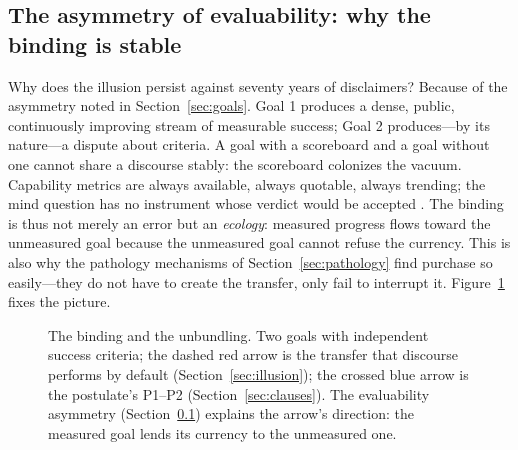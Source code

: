 \documentclass[10pt]{article}
\begin{document}
\subsection{The asymmetry of evaluability: why the binding is stable}\label{sec:asymmetry}

Why does the illusion persist against seventy years of disclaimers? Because of the asymmetry noted in Section~\ref{sec:goals}. Goal 1 produces a dense, public, continuously improving stream of measurable success; Goal 2 produces---by its nature---a dispute about criteria. A goal with a scoreboard and a goal without one cannot share a discourse stably: the scoreboard colonizes the vacuum. Capability metrics are always available, always quotable, always trending; the mind question has no instrument whose verdict would be accepted \cite{butlin2023consciousness,albantakis2023iit}. The binding is thus not merely an error but an \emph{ecology}: measured progress flows toward the unmeasured goal because the unmeasured goal cannot refuse the currency. This is also why the pathology mechanisms of Section~\ref{sec:pathology} find purchase so easily---they do not have to create the transfer, only fail to interrupt it. Figure~\ref{fig:binding} fixes the picture.

\begin{figure}[t]
\centering
{}
\caption{The binding and the unbundling. Two goals with independent success criteria; the dashed red arrow is the transfer that discourse performs by default (Section~\ref{sec:illusion}); the crossed blue arrow is the postulate's P1--P2 (Section~\ref{sec:clauses}). The evaluability asymmetry (Section~\ref{sec:asymmetry}) explains the arrow's direction: the measured goal lends its currency to the unmeasured one.}
\label{fig:binding}
\end{figure}
\end{document}
